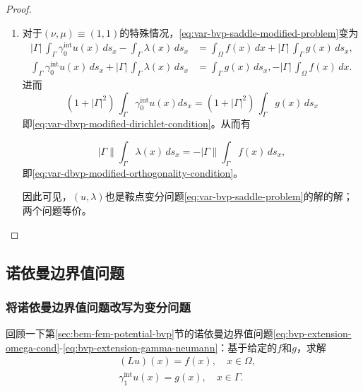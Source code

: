 \begin{proof}
\begin{enumerate}
  \item 对于$(\nu,\mu) \equiv (1,1)$的特殊情况，\eqref{eq:var-bvp-saddle-modified-problem}变为
  \begin{equation*}
    \begin{split}
      \big| \Gamma \big| \, \int_{\Gamma} \gamma_{0}^{\text{int}} u(x) \, d s_x - \int_{\Gamma} \lambda(x) \, d s_x &= \int_{\Omega} f(x) \, d x + \big| \Gamma \big| \, \int_{\Gamma} g(x) \, d s_x,\\
      \int_{\Gamma} \gamma_{0}^{\text{int}} u(x) \, d s_x
      + \big| \Gamma \big| \, \int_{\Gamma} \lambda(x) \, d s_x &=
      \int_{\Gamma} g(x) \, d s_x, - \big| \Gamma \big| \, \int_{\Omega} f(x) \, d x.
    \end{split}
  \end{equation*}
进而
  \begin{equation*}
    \left( 1 + \big| \Gamma \big|^2 \right) \, \int_{\Gamma} \gamma_{0}^{\text{int}} u(x) d s_x = \left( 1 + \big| \Gamma \big|^2 \right) \, \int_{\Gamma} g(x) \, d s_x
  \end{equation*}
即\eqref{eq:var-dbvp-modified-dirichlet-condition}。从而有

\begin{equation*}
  \big| \Gamma \big\| \int_{\Gamma} \lambda(x) \, d s_x = - \big| \Gamma \big\| \int_{\Gamma} f(x) \, d s_x ,
\end{equation*}
即\eqref{eq:var-dbvp-modified-orthogonality-condition}。

因此可见，$(u,\lambda)$也是鞍点变分问题\eqref{eq:var-bvp-saddle-problem}的解的解；两个问题等价。
\end{enumerate}
\end{proof}

\subsection{诺依曼边界值问题}
\label{sec:var-nbvp-problem}


\subsubsection{将诺依曼边界值问题改写为变分问题}
回顾一下第\ref{sec:bem-fem-potential-bvp}节的诺依曼边界值问题\eqref{eq:bvp-extension-omega-cond}-\eqref{eq:bvp-extension-gamma-neumann}：基于给定的$f$和$g$，求解
\begin{equation}
  \label{eq:var-nbvp-problem}
  \begin{split}
    & \left( L u\right)(x) = f(x), \quad x\in \Omega,\\
    & \gamma_{1}^{\text{int}} u(x) = g(x), \quad x \in \Gamma.
  \end{split}
\end{equation}

